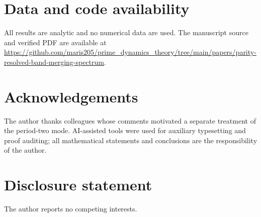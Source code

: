 \documentclass[11pt]{article}
\theoremstyle{definition}
\theoremstyle{remark}
\begin{document}
\section*{Data and code availability}

All results are analytic and no numerical data are used.  The manuscript source and verified PDF are available at \url{https://github.com/maris205/prime_dynamics_theory/tree/main/papers/parity-resolved-band-merging-spectrum}.

\section*{Acknowledgements}

The author thanks colleagues whose comments motivated a separate treatment of the period-two mode.  AI-assisted tools were used for auxiliary typesetting and proof auditing; all mathematical statements and conclusions are the responsibility of the author.

\section*{Disclosure statement}

The author reports no competing interests.



\end{document}
